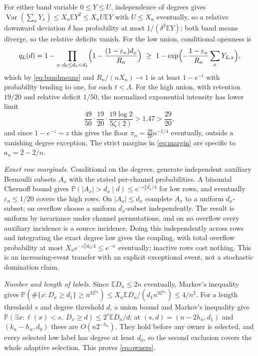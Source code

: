 \documentclass[11pt,letterpaper]{article}
\theoremstyle{plain}
\theoremstyle{definition}
\theoremstyle{remark}
\numberwithin{equation}{section}
\newcommand{\PP}{\mathbb P}
\newcommand{\EE}{\mathbb E}
\newcommand{\eps}{\varepsilon}
\begin{document}
For either band variable $0\le Y\le U$, independence of degrees gives $\operatorname{Var}(\sum_xY_x)\le X_n\EE Y^2\le X_nU\EE Y$ with $U\le X_n$ eventually, so a relative downward deviation $\delta$ has probability at most $1/(\delta^2\EE Y)$; both band means diverge, so the relative deficits vanish. For the low union, conditional openness is
\[
 q_L(d)=1-\prod_{x:\,d_0\le d_x<d_1}\Bigl(1-\frac{(1-\eps_n)d_x}{R_n}\Bigr)\ \ge\ 1-\exp\Bigl(-\frac{1-\eps_n}{R_n}\sum_xY_{L,x}\Bigr),
\]
which by \eqref{eq:bandmeans} and $R_n/(nX_n)\to1$ is at least $1-e^{-t}$ with probability tending to one, for each $t<\Lambda$. For the high union, with retention $19/20$ and relative deficit $1/50$, the normalized exponential intensity has lower limit
\begin{equation}\label{eq:margin}
 \frac{49}{50}\cdot\frac{19}{20}\cdot\frac{19\log2}{5\zeta(2)}>1.47>\frac{29}{20},
\end{equation}
and since $1-e^{-z}\sim z$ this gives the floor $\pi_n=\frac{29}{20}n^{-1/4}$ eventually, outside a vanishing degree exception. The strict margins in \eqref{eq:margin} are specific to $a_n=2-2/n$.

\emph{Exact row marginals.} Conditional on the degrees, generate independent auxiliary Bernoulli subsets $A_x$ with the stated per-channel probabilities. A binomial Chernoff bound gives $\PP(|A_x|>d_x\mid d)\le e^{-\eps_n^2d_x/4}$ for low rows, and eventually $\eps_n\le1/20$ covers the high rows. On $|A_x|\le d_x$ complete $A_x$ to a uniform $d_x$-subset; on overflow choose a uniform $d_x$-subset independently. The result is uniform by invariance under channel permutations, and on no overflow every auxiliary incidence is a source incidence. Doing this independently across rows and integrating the exact degree law gives the coupling, with total overflow probability at most $X_ne^{-\eps_n^2d_0/4}\le e^{-n}$ eventually; inactive rows cost nothing. This is an increasing-event transfer with an explicit exceptional event, not a stochastic domination claim.

\emph{Number and length of labels.} Since $\EE D_n\le2n$ eventually, Markov's inequality gives $\PP(\#\{x:D_x\ge d_1\}\ge n^32^{h_n})\le X_n\EE D_n/(d_1n^32^{h_n})\le4/n^2$. For a length threshold $s$ and degree threshold $d$, a union bound and Markov's inequality give $\PP(\exists x:\ell(x)<s,\ D_x\ge d)\le2^s\EE D_n/d$; at $(s,d)=(n-2h_n,d_1)$ and $(k_n-h_n,d_0)$ these are $O(n2^{-h_n})$. They hold before any owner is selected, and every selected low label has degree at least $d_0$, so the second exclusion covers the whole adaptive selection. This proves \eqref{eq:owners}.
\end{document}
